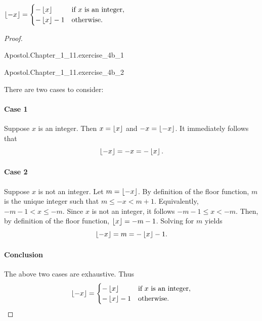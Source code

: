 \documentclass{report}
\begin{document}
\subsection{}%
\label{sub:exercise-1.11.4b}

$\left\lfloor-x\right\rfloor =
  \begin{cases}
    -\left\lfloor x\right\rfloor & \text{if } x \text{ is an integer}, \\
    -\left\lfloor x\right\rfloor - 1 & \text{otherwise}.
  \end{cases}$

\begin{proof}

  \ \vspace{6pt}

    {Apostol.Chapter\_1\_11.exercise\_4b\_1}

    {Apostol.Chapter\_1\_11.exercise\_4b\_2}

  There are two cases to consider:

  \paragraph{Case 1}%

    Suppose $x$ is an integer.
    Then $x = \left\lfloor x\right\rfloor$ and $-x = \left\lfloor-x\right\rfloor$.
    It immediately follows that $$\left\lfloor-x\right\rfloor = -x = -\left\lfloor x\right\rfloor.$$

  \paragraph{Case 2}%

    Suppose $x$ is not an integer.
    Let $m = \left\lfloor-x\right\rfloor$.
    By definition of the floor function, $m$ is the unique integer such that
      $m \leq -x < m + 1$.
    Equivalently, $-m - 1 < x \leq -m$.
    Since $x$ is not an integer, it follows $-m - 1 \leq x < -m$.
    Then, by definition of the floor function, $\left\lfloor x\right\rfloor = -m - 1$.
    Solving for $m$ yields $$\left\lfloor-x\right\rfloor = m = -\left\lfloor x\right\rfloor - 1.$$

  \paragraph{Conclusion}%

    The above two cases are exhaustive. Thus
      $$\left\lfloor-x\right\rfloor =
        \begin{cases}
          -\left\lfloor x\right\rfloor & \text{if } x \text{ is an integer}, \\
          -\left\lfloor x\right\rfloor - 1 & \text{otherwise}.
        \end{cases}$$

\end{proof}
\end{document}
